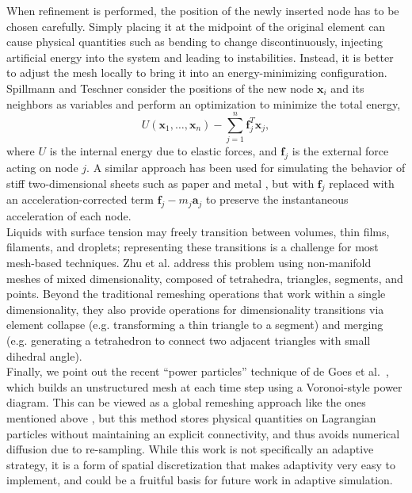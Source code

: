 When refinement is performed, the position of the newly inserted node has to be chosen carefully.
Simply placing it at the midpoint of the original element can cause physical quantities such as bending to change discontinuously, injecting artificial energy into the system and leading to instabilities.
Instead, it is better to adjust the mesh locally to bring it into an energy-minimizing configuration.
Spillmann and Teschner \cite{Spillmann2008} consider the positions of the new node $\mathbf x_i$ and its neighbors as variables and perform an optimization to minimize the total energy,
\begin{equation}
	U(\mathbf x_1,\ldots,\mathbf x_n) - \sum_{j=1}^n\mathbf f_j^T\mathbf x_j,
\end{equation}
where $U$ is the internal energy due to elastic forces, and $\mathbf f_j$ is the external force acting on node $j$.
A similar approach has been used for simulating the behavior of stiff two-dimensional sheets such as paper and metal \cite{Narain2013,Pfaff2014}, but with $\mathbf f_j$ replaced with an acceleration-corrected term $\mathbf f_j - m_j\mathbf a_j$ to preserve the instantaneous acceleration of each node.
\\
Liquids with surface tension may freely transition between volumes, thin films, filaments, and droplets; representing these transitions is a challenge for most mesh-based techniques.
Zhu et al. \cite{Zhu2014} address this problem using non-manifold meshes of mixed dimensionality, composed of tetrahedra, triangles, segments, and points.
Beyond the traditional remeshing operations that work within a single dimensionality, they also provide operations for dimensionality transitions via element collapse (e.g. transforming a thin triangle to a segment) and merging (e.g. generating a tetrahedron to connect two adjacent triangles with small dihedral angle).
\\
Finally, we point out the recent ``power particles'' technique of de Goes et al.~\cite{deGoes2015}, which builds an unstructured mesh at each time step using a Voronoi-style power diagram.
This can be viewed as a global remeshing approach like the ones mentioned above \cite{Klingner2006,Bargteil2007}, but this method stores physical quantities on Lagrangian particles without maintaining an explicit connectivity, and thus avoids numerical diffusion due to re-sampling.
While this work is not specifically an adaptive strategy, it is a form of spatial discretization that makes adaptivity very easy to implement, and could be a fruitful basis for future work in adaptive simulation.

